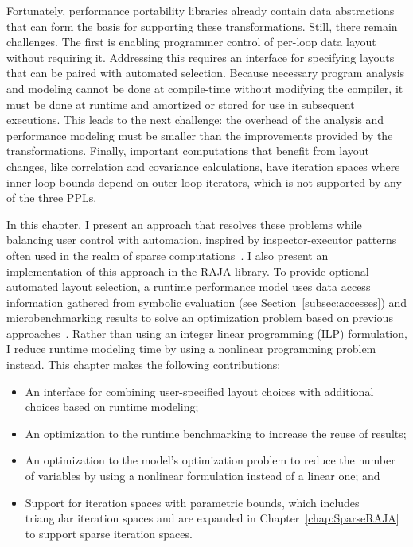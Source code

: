 Fortunately, performance portability libraries already contain data abstractions that can form the basis for supporting these transformations.
Still, there remain challenges.
The first is enabling programmer control of per-loop data layout without requiring it.
Addressing this requires an interface for specifying layouts that can be paired with automated selection.
Because necessary program analysis and modeling cannot be done at compile-time without modifying the compiler, it must be done at runtime and amortized or stored for use in subsequent executions.
This leads to the next challenge: the overhead of the analysis and performance modeling must be smaller than the improvements provided by the transformations.
Finally, important computations that benefit from layout changes, like correlation and covariance calculations, have iteration spaces where inner loop bounds depend on outer loop iterators, which is not supported by any of the three PPLs.  %

In this chapter, I present an approach that resolves these problems while balancing user control with automation, inspired by inspector-executor patterns often used in the realm of sparse computations~\cite{saltz1990run,saltz1991multiprocessors,Strout14IPDPS,strout2018sparse}.
I also present an implementation of this approach in the RAJA library.
To provide optional automated layout selection, a runtime performance model uses data access information gathered from symbolic evaluation (see Section~\ref{subsec:accesses}) and microbenchmarking results to solve an optimization problem based on previous approaches~\cite{bixby1994automatic}.
Rather than using an integer linear programming (ILP) formulation, I reduce runtime modeling time by using a nonlinear programming problem instead. 
This chapter makes the following contributions:
\begin{itemize}
\item An interface for combining user-specified layout choices with additional choices based on runtime modeling;
\item An optimization to the runtime benchmarking to increase the reuse of results;
\item An optimization to the model's optimization problem to reduce the number of variables by using a nonlinear formulation instead of a linear one; and 
\item Support for iteration spaces with parametric bounds, which includes triangular iteration spaces and are expanded in Chapter~\ref{chap:SparseRAJA} to support sparse iteration spaces. %
\end{itemize}

